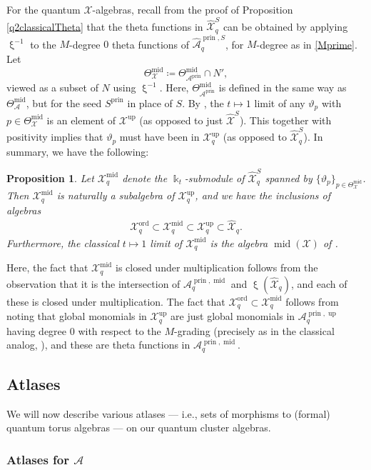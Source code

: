 \documentclass{amsart}
\DeclareMathOperator{\prin}{prin}
\DeclareMathOperator{\up}{up}
\DeclareMathOperator{\midd}{mid}
\DeclareMathOperator{\ord}{ord}
\let\s=\mathcal
\let\wh=\widehat
\newcommand {\kk} {\Bbbk}
\newcommand {\kt} {\kk_t}
\renewcommand{\xi}{\upxi}
\theoremstyle{plain}%
\newtheorem{prop}[thm]{Proposition}
\theoremstyle{definition}
\theoremstyle{remark}
\begin{document}
For the quantum $\s{X}$-algebras, recall from the proof of Proposition \ref{q2classicalTheta} that the theta functions in $\wh{\s{X}}_q^S$ can be obtained by applying $\xi^{-1}$ to the $M$-degree $0$ theta functions of $\wh{\s{A}}_q^{\prin,S}$, for $M$-degree as in \eqref{Mprime}.  Let $$\Theta^{\midd}_{\s{X}}\coloneqq \Theta_{\s{A}^{\prin}}^{\midd}\cap N',$$
viewed as a subset of $N$ using $\xi^{-1}$.  Here, $\Theta_{\s{A}^{\prin}}^{\midd}$ is defined in the same way as $\Theta_{\s{A}}^{\midd}$, but for the seed $S^{\prin}$ in place of $S$.  By \cite[Lem. 7.10(3)]{GHKK}, the $t\mapsto 1$ limit of any $\vartheta_p$ with $p\in \Theta^{\midd}_{\s{X}}$ is an element of $\s{X}^{\up}$ (as opposed to just $\wh{\s{X}}^S$).  This together with positivity implies that $\vartheta_p$ must have been in $\s{X}_q^{\up}$ (as opposed to $\wh{\s{X}}_q^S$).  In summary, we have the following:
\begin{prop}\label{midX}
Let $\s{X}_q^{\midd}$ denote the $\kt$-submodule of $\wh{\s{X}}_q^S$ spanned by $\{\vartheta_p\}_{p\in \Theta^{\midd}_{\s{X}}}$.  Then  $\s{X}_q^{\midd}$ is naturally a subalgebra of $\s{X}^{\up}_q$, and we have the inclusions of algebras
\begin{align*}
   \s{X}_q^{\ord} \subset \s{X}^{\midd}_q \subset \s{X}^{\up}_q \subset \wh{\s{X}}_q.
\end{align*}
Furthermore, the classical $t\mapsto 1$ limit of $\s{X}_q^{\midd}$ is the algebra $\midd(\s{X})$ of \cite{GHKK}.
\end{prop}
Here, the fact that $\s{X}_q^{\midd}$ is closed under multiplication follows from the observation that it is the intersection of $\s{A}_q^{\prin,\midd}$ and $\xi(\wh{\s{X}}_q)$, and each of these is closed under multiplication.  The fact that $\s{X}_q^{\ord}\subset \s{X}_q^{\midd}$ follows from noting that global monomials in $\s{X}_q^{\up}$ are just global monomials in $\s{A}_q^{\prin,\up}$ having degree $0$ with respect to the $M$-grading (precisely as in the classical analog, \cite[Lem. 7.10(3)]{GHKK}), and these are theta functions in $\s{A}_q^{\prin,\midd}$.


\subsection{Atlases}\label{iotaQrmk}

We will now describe various atlases --- i.e., sets of morphisms to (formal) quantum torus algebras --- on our quantum cluster algebras.


\subsubsection{Atlases for $\s{A}$}
\end{document}
